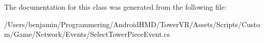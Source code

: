 The documentation for this class was generated from the following file\+:\begin{DoxyCompactItemize}
\item 
/\+Users/benjamin/\+Programmering/\+Android\+H\+M\+D/\+Tower\+V\+R/\+Assets/\+Scripts/\+Custom/\+Game/\+Network/\+Events/Select\+Tower\+Piece\+Event.\+cs\end{DoxyCompactItemize}
